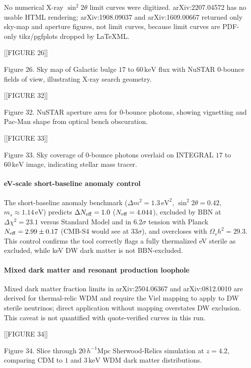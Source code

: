 \documentclass[11pt,a4paper]{article}
\begin{document}
No numerical X-ray $\sin^2 2\theta$ limit curves were digitized. arXiv:2207.04572 has no usable HTML rendering; arXiv:1908.09037 and arXiv:1609.00667 returned only sky-map and aperture figures, not limit curves, because limit curves are PDF-only tikz/pgfplots dropped by LaTeXML.


[[FIGURE 26]]

Figure 26. Sky map of Galactic bulge $17$ to $60\,\mathrm{keV}$ flux with NuSTAR 0-bounce fields of view, illustrating X-ray search geometry.


[[FIGURE 32]]

Figure 32. NuSTAR aperture area for 0-bounce photons, showing vignetting and Pac-Man shape from optical bench obscuration.


[[FIGURE 33]]

Figure 33. Sky coverage of 0-bounce photons overlaid on INTEGRAL $17$ to $60\,\mathrm{keV}$ image, indicating stellar mass tracer.

\paragraph{eV-scale short-baseline anomaly control}
The short-baseline anomaly benchmark ($\Delta m^2 = 1.3\,\mathrm{eV}^2$, $\sin^2 2\theta = 0.42$, $m_s \approx 1.14\,\mathrm{eV}$) predicts $\Delta N_{\rm eff} = 1.0$ ($N_{\rm eff} = 4.044$), excluded by BBN at $\Delta\chi^2 = 23.1$ versus Standard Model and in $6.2\sigma$ tension with Planck $N_{\rm eff} = 2.99 \pm 0.17$ (CMB-S4 would see at $33\sigma$), and overcloses with $\Omega_s h^2 = 29.3$. This control confirms the tool correctly flags a fully thermalized eV sterile as excluded, while keV DW dark matter is not BBN-excluded.

\paragraph{Mixed dark matter and resonant production loophole}
Mixed dark matter fraction limits in arXiv:2504.06367 and arXiv:0812.0010 are derived for thermal-relic WDM and require the Viel mapping to apply to DW sterile neutrinos; direct application without mapping overstates DW exclusion. This caveat is not quantified with quote-verified curves in this run.


[[FIGURE 34]]

Figure 34. Slice through $20\,h^{-1}\mathrm{Mpc}$ Sherwood-Relics simulation at $z=4.2$, comparing CDM to $1$ and $3\,\mathrm{keV}$ WDM dark matter distributions.
\end{document}
